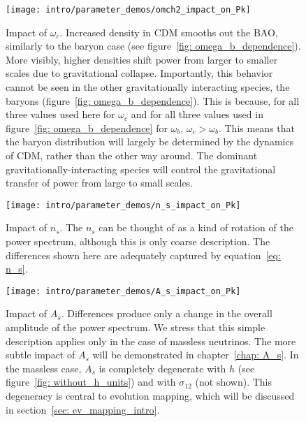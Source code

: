 \begin{figure}[htb]
  \centering
  \texttt{[image: intro/parameter\_demos/omch2\_impact\_on\_Pk]}
  \caption[Impact of $\omega_c$ on $P(k)$]{Impact of $\omega_c$. Increased
  	density in CDM smooths out the BAO, similarly to the baryon case
  	(see figure~\ref{fig: omega_b_dependence}). More visibly, higher
  	densities shift power from larger to smaller scales due to gravitational 
  	collapse. Importantly, this behavior cannot be seen in the other
  	gravitationally interacting species, the baryons
  	(figure~\ref{fig: omega_b_dependence}). This is because, for all three
  	values used here for $\omega_c$ and for all three values used in
  	figure~\ref{fig: omega_b_dependence} for $\omega_b$,
  	$\omega_c > \omega_b$. This means that the baryon distribution will
  	largely be determined by the dynamics of CDM, rather than the
  	other way around. The dominant gravitationally-interacting species will
  	control the gravitational transfer of power from large to small scales.}
  \label{fig: omega_c_dependence}
\end{figure}


\begin{figure}[htb]
  \centering
  \texttt{[image: intro/parameter\_demos/n\_s\_impact\_on\_Pk]}
  \caption[Impact of $n_s$ on $P(k)$]{Impact of $n_s$. The $n_s$ can be
  thought of as a kind of rotation of the power spectrum, although this
  is only coarse description. The differences shown here are
  adequately captured by equation~\ref{eq: n_s}.}
  \label{fig: n_s_dependence}
\end{figure}

\begin{figure}[htb]
  \centering
  \texttt{[image: intro/parameter\_demos/A\_s\_impact\_on\_Pk]}
  \caption[Impact of $A_s$ on $P(k)$]{Impact of $A_s$. Differences produce
  	only a change in the overall amplitude of the power spectrum. We stress
  	that this simple description applies only in the case of massless
  	neutrinos. The more subtle impact of $A_s$ will be demonstrated in
  	chapter~\ref{chap: A_s}. In the massless case, $A_s$ is completely
  	degenerate with $h$ (see figure~\ref{fig: without_h_units}) and with
  	$\sigma_{12}$ (not shown). This degeneracy is central to evolution
  	mapping, which will be discussed in section~\ref{sec: ev_mapping_intro}.}
  \label{fig: A_s_dependence}
\end{figure}

